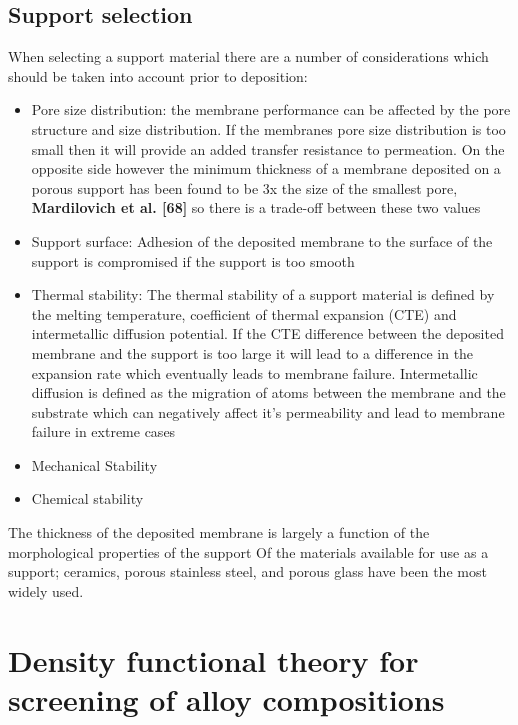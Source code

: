 \subsection{Support selection}
When selecting a support material there are a number of considerations which should be taken 
into account prior to deposition:
\begin{itemize}
\item Pore size distribution: the membrane performance can be affected by the pore structure 
and size distribution. If the membranes pore size distribution is too small then it will 
provide an added transfer resistance to permeation. On the opposite side however the minimum 
thickness of a membrane deposited on a porous support has been found to be 3x the size of the 
smallest pore, \textbf{Mardilovich et al. [68]}  so there is a trade-off between these two 
values
\item Support surface: Adhesion of the deposited membrane to the surface of the support is 
compromised if the support is too smooth
\item Thermal stability: The thermal stability of a support material is defined by the 
melting temperature, coefficient of thermal expansion (CTE) and intermetallic diffusion 
potential. If the CTE difference between the deposited membrane and the support is too large 
it will lead to a difference in the expansion rate which eventually leads to membrane failure. Intermetallic diffusion is defined as the migration of atoms between the membrane and the substrate which can negatively affect it’s permeability and lead to membrane failure in extreme cases
\item Mechanical Stability
\item Chemical stability
\end{itemize}
The thickness of the deposited membrane is largely a function of the morphological properties 
of the support 
Of the materials available for use as a support; ceramics, porous stainless steel, and porous 
glass have been the most widely used. 



\section{Density functional theory for screening of alloy compositions}






